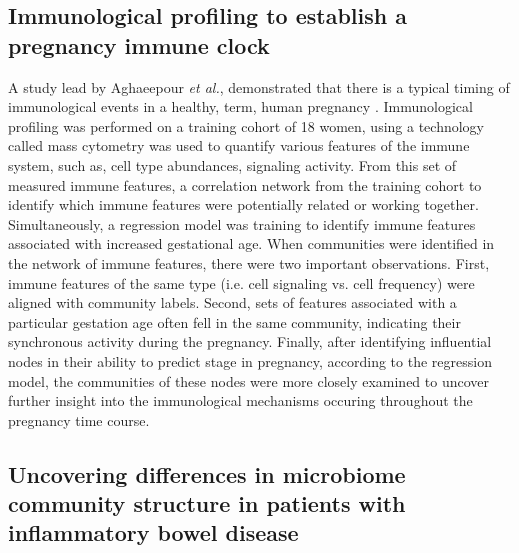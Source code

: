 \subsection{Immunological profiling to establish a pregnancy immune clock}
A study lead by Aghaeepour \emph{et al.}, demonstrated that there is a typical timing of immunological events in a healthy, term, human pregnancy \cite{immuneClock}. Immunological profiling was performed on a training cohort of 18 women, using a technology called mass cytometry \cite{cytof} was used to quantify various features of the immune system, such as, cell type abundances, signaling activity. From this set of measured immune features, a correlation network from the training cohort to identify which immune features were potentially related or working together. Simultaneously, a regression model was training to identify immune features associated with increased gestational age. When communities were identified in the network of immune features, there were two important observations. First, immune features of the same type (i.e. cell signaling vs. cell frequency) were aligned with community labels. Second, sets of features associated with a particular gestation age often fell in the same community, indicating their synchronous activity during the pregnancy. Finally, after identifying influential nodes in their ability to predict stage in pregnancy, according to the regression model, the communities of these nodes were more closely examined to uncover further insight into the immunological mechanisms occuring throughout the pregnancy time course. 

\subsection{Uncovering differences in microbiome community structure in patients with inflammatory bowel disease}

